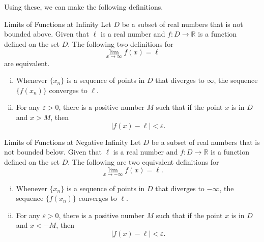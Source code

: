 Using these, we can make the following definitions.
  
\begin{definition}{Limits of Functions at Infinity}
Let $D$ be a subset of real numbers that is not bounded above. Given  that $\ell$ is a real number and $f:D\rightarrow\mathbb{R}$  is a function  defined on the set $D$.  The following  two   definitions for
\[\lim_{x\rightarrow\infty}f(x)=\ell \]are equivalent.
\begin{enumerate}[(i)]
\item Whenever $\{x_n\}$ is a sequence of points in $D$ that diverges to $\infty$, the sequence $\{f(x_n)\}$ converges to  $\ell$. 
\item For any $\varepsilon>0$, there is a positive number $M  $ such that if the point $x$ is in $D$ and $x>M$, then
\[|f(x)-\ell|<\varepsilon.\]
\end{enumerate}
\end{definition}

\begin{definition}{Limits of Functions at Negative Infinity}
Let $D$ be a subset of real numbers that is not bounded below. Given  that $\ell$ is a real number and $f:D\rightarrow\mathbb{R}$  is a function  defined on the set $D$.  The following  are two equivalent definitions for
\[\lim_{x\rightarrow-\infty}f(x)=\ell.\]
\begin{enumerate}[(i)]
\item Whenever $\{x_n\}$ is a sequence of points in $D$ that diverges to $-\infty$, the sequence $\{f(x_n)\}$ converges to  $\ell$. 
\item For any $\varepsilon>0$, there is a positive number $M  $ such that if the point $x$ is in $D$ and $x<-M$, then
\[|f(x)-\ell|<\varepsilon.\]
\end{enumerate}
\end{definition}

